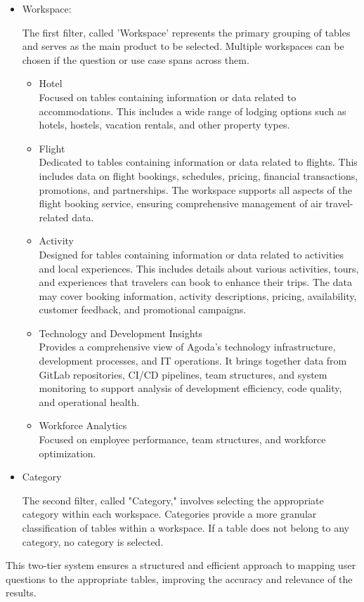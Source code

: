     \begin{itemize}
        \item Workspace:
        
        The first filter, called 'Workspace' represents the primary grouping of tables and serves as the main product to be selected. Multiple workspaces can be chosen if the question or use case spans across them.
            \begin{itemize}
                \item Hotel \\
                Focused on tables containing information or data related to accommodations. This includes a wide range of lodging options such as hotels, hostels, vacation rentals, and other property types. 
                \item Flight \\
                Dedicated to tables containing information or data related to flights. This includes data on flight bookings, schedules, pricing, financial transactions, promotions, and partnerships. The workspace supports all aspects of the flight booking service, ensuring comprehensive management of air travel-related data.

                \item {Activity} \\
                Designed for tables containing information or data related to activities and local experiences. This includes details about various activities, tours, and experiences that travelers can book to enhance their trips. The data may cover booking information, activity descriptions, pricing, availability, customer feedback, and promotional campaigns.

                \item {Technology and Development Insights} \\
                Provides a comprehensive view of Agoda's technology infrastructure, development processes, and IT operations. It brings together data from GitLab repositories, CI/CD pipelines, team structures, and system monitoring to support analysis of development efficiency, code quality, and operational health.

                \item {Workforce Analytics} \\
                Focused on employee performance, team structures, and workforce optimization.
            \end{itemize}

        \item Category
        
        The second filter, called "Category," involves selecting the appropriate category within each workspace. Categories provide a more granular classification of tables within a workspace. If a table does not belong to any category, no category is selected.
    \end{itemize}
    This two-tier system ensures a structured and efficient approach to mapping user questions to the appropriate tables, improving the accuracy and relevance of the results.


